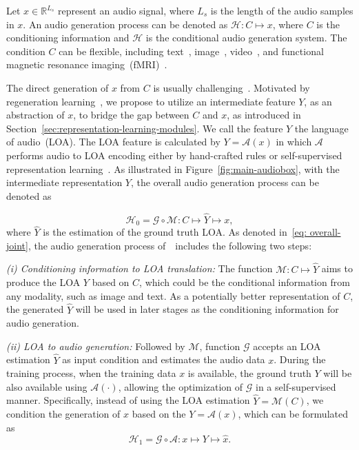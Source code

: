 \documentclass[lettersize,journal]{IEEEtran}
\begin{document}
\noindent
Let $x\in \mathbb{R}^{L_{s}}$ represent an audio signal, where $L_{s}$ is the length of the audio samples in $x$. An audio generation process can be denoted as $\mathcal{H}: C\mapsto x$, where $C$ is the conditioning information and $\mathcal{H}$ is the conditional audio generation system. The condition $C$ can be flexible, including text~\cite{liu2023audioldm}, image~\cite{sheffer2023hear-image-to-audio}, video~\cite{iashin2021taming-specvqgan}, and functional magnetic resonance imaging~(fMRI)~\cite{denk2023brain2music}. 



The direct generation of $x$ from $C$ is usually challenging~\cite{oord2016wavenet}. Motivated by regeneration learning~\cite{tan2023regeneration}, we propose to utilize an intermediate feature $Y$, as an abstraction of $x$, to bridge the gap between $C$ and $x$, as introduced in Section~\ref{sec:representation-learning-modules}. We call the feature $Y$ the language of audio~(LOA). The LOA feature is calculated by $Y=\mathcal{A}(x)$ 
in which $\mathcal{A}$ performs audio to LOA encoding either by hand-crafted rules or self-supervised representation learning~\cite{tan2023regeneration}. 
As illustrated in Figure~\ref{fig:main-audiobox}, with the intermediate representation $Y$, the overall audio generation process can be denoted as 

\begin{equation}
    \mathcal{H}_{0}=\mathcal{G} \circ \mathcal{M} : C\mapsto \hat{Y} \mapsto x,
    \label{eq: overall-joint}
\end{equation}
where $\hat{Y}$ is the estimation of the ground truth LOA.
As denoted in~\eqref{eq: overall-joint}, the audio generation process of~\vModelName~includes the following two steps: 

\textit{(i) Conditioning information to LOA translation:}
The function $\mathcal{M}:C\mapsto\hat{Y}$ aims to produce the LOA $Y$ based on $C$, which could be the conditional information from any modality, such as image and text. As a potentially better representation of $C$, the generated $\hat{Y}$ will be used in later stages as the conditioning information for audio generation. 


\textit{(ii) LOA to audio generation:}
Followed by $\mathcal{M}$, function $\mathcal{G}$ accepts an LOA estimation $\hat{Y}$ as input condition and estimates the audio data $x$. 
During the training process, when the training data $x$ is available, the ground truth $Y$ will be also available using $\mathcal{A}(\cdot)$, allowing the optimization of $\mathcal{G}$ in a self-supervised manner. Specifically, instead of using the LOA estimation $\hat{Y}=\mathcal{M}(C)$, we condition the generation of $x$ based on the $Y=\mathcal{A}(x)$, which can be formulated as
\begin{equation}
    \mathcal{H}_{1}=\mathcal{G} \circ \mathcal{A} : x\mapsto Y \mapsto \hat{x}.
    \label{eq: ssl-pretrain}
\end{equation}
\end{document}

